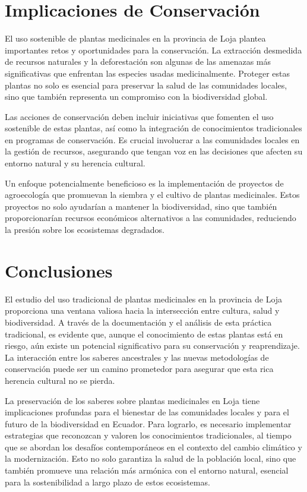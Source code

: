 \documentclass[
  letterpaper,
  DIV=11,
  numbers=noendperiod,
  oneside]{scrreprt}
\begin{document}
\section{Implicaciones de
Conservación}\label{implicaciones-de-conservaciuxf3n}

El uso sostenible de plantas medicinales en la provincia de Loja plantea
importantes retos y oportunidades para la conservación. La extracción
desmedida de recursos naturales y la deforestación son algunas de las
amenazas más significativas que enfrentan las especies usadas
medicinalmente. Proteger estas plantas no solo es esencial para
preservar la salud de las comunidades locales, sino que también
representa un compromiso con la biodiversidad global.

Las acciones de conservación deben incluir iniciativas que fomenten el
uso sostenible de estas plantas, así como la integración de
conocimientos tradicionales en programas de conservación. Es crucial
involucrar a las comunidades locales en la gestión de recursos,
asegurando que tengan voz en las decisiones que afecten su entorno
natural y su herencia cultural.

Un enfoque potencialmente beneficioso es la implementación de proyectos
de agroecología que promuevan la siembra y el cultivo de plantas
medicinales. Estos proyectos no solo ayudarían a mantener la
biodiversidad, sino que también proporcionarían recursos económicos
alternativos a las comunidades, reduciendo la presión sobre los
ecosistemas degradados.

\section{Conclusiones}\label{conclusiones-2}

El estudio del uso tradicional de plantas medicinales en la provincia de
Loja proporciona una ventana valiosa hacia la intersección entre
cultura, salud y biodiversidad. A través de la documentación y el
análisis de esta práctica tradicional, es evidente que, aunque el
conocimiento de estas plantas está en riesgo, aún existe un potencial
significativo para su conservación y reaprendizaje. La interacción entre
los saberes ancestrales y las nuevas metodologías de conservación puede
ser un camino prometedor para asegurar que esta rica herencia cultural
no se pierda.

La preservación de los saberes sobre plantas medicinales en Loja tiene
implicaciones profundas para el bienestar de las comunidades locales y
para el futuro de la biodiversidad en Ecuador. Para lograrlo, es
necesario implementar estrategias que reconozcan y valoren los
conocimientos tradicionales, al tiempo que se abordan los desafíos
contemporáneos en el contexto del cambio climático y la modernización.
Esto no solo garantiza la salud de la población local, sino que también
promueve una relación más armónica con el entorno natural, esencial para
la sostenibilidad a largo plazo de estos ecosistemas.
\end{document}
